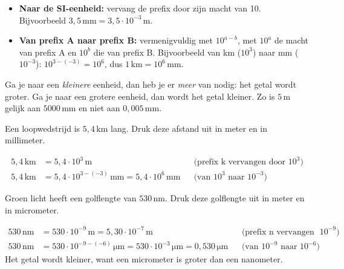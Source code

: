 \documentclass{ximera}
\begin{document}
\begin{proposition}[title={Omzetten met machten van 10}]\nl
    \begin{itemize}
        \item \textbf{Naar de SI-eenheid:} vervang de prefix door zijn macht van 10. Bijvoorbeeld $3{,}5 \, \mathrm{mm} = 3{,}5 \cdot 10^{-3} \, \mathrm{m}$.
        \item \textbf{Van prefix A naar prefix B:} vermenigvuldig met $10^{a-b}$, met $10^{a}$ de macht van prefix A en $10^{b}$ die van prefix B. Bijvoorbeeld van km ($10^{3}$) naar mm ($10^{-3}$): $10^{3-(-3)} = 10^{6}$, dus $1 \, \mathrm{km} = 10^{6} \, \mathrm{mm}$.
    \end{itemize}
\end{proposition}

\begin{remark}[title={Controleer met je gevoel}]\nl
    Ga je naar een \emph{kleinere} eenheid, dan heb je er \emph{meer} van nodig: het getal wordt groter. Ga je naar een grotere eenheid, dan wordt het getal kleiner. Zo is $5 \, \mathrm{m}$ gelijk aan $5000 \, \mathrm{mm}$ en niet aan $0{,}005 \, \mathrm{mm}$.
\end{remark}

\begin{example}[foldable=true,title={Voorbeeld: kilometer naar meter en millimeter}]\nl
    Een loopwedstrijd is $5{,}4 \, \mathrm{km}$ lang. Druk deze afstand uit in meter en in millimeter.

    \begin{solution}\nl
        \begin{align*}
            5{,}4 \, \mathrm{km} &= 5{,}4 \cdot 10^{3} \, \mathrm{m} && \text{(prefix k vervangen door $10^{3}$)}\\
            5{,}4 \, \mathrm{km} &= 5{,}4 \cdot 10^{3-(-3)} \, \mathrm{mm} = \boxed{5{,}4 \cdot 10^{6} \, \mathrm{mm}} && \text{(van $10^{3}$ naar $10^{-3}$)}
        \end{align*}
    \end{solution}
\end{example}

\begin{example}[foldable=true,title={Voorbeeld: nanometer naar meter en micrometer}]\nl
    Groen licht heeft een golflengte van $530 \, \mathrm{nm}$. Druk deze golflengte uit in meter en in micrometer.

    \begin{solution}\nl
        \begin{align*}
            530 \, \mathrm{nm} &= 530 \cdot 10^{-9} \, \mathrm{m} = \boxed{5{,}30 \cdot 10^{-7} \, \mathrm{m}} && \text{(prefix n vervangen door $10^{-9}$)}\\
            530 \, \mathrm{nm} &= 530 \cdot 10^{-9-(-6)} \, \mathrm{\mu m} = 530 \cdot 10^{-3} \, \mathrm{\mu m} = \boxed{0{,}530 \, \mathrm{\mu m}} && \text{(van $10^{-9}$ naar $10^{-6}$)}
        \end{align*}
        Het getal wordt kleiner, want een micrometer is groter dan een nanometer.
    \end{solution}
\end{example}
\end{document}
